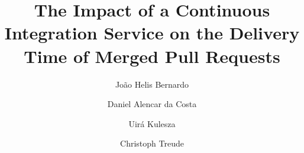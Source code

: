 \usepackage{fancyvrb} %
\usepackage{fvextra} %
\usepackage{appendix}
\usepackage{microtype}

\usepackage{tabularx}




\newcommand{\ct}[1] {\textcolor{purple}{[\textbf{Christoph}: #1]} }
\newcommand{\dac}[1] {\textcolor{blue}{[\textbf{Dan}: #1]} }
\newcommand{\jh}[1] {\textcolor{red}{[\textbf{Jo\~{a}o}: #1]} }

\newcommand{\RQone}{RQ1: Are merged pull requests released more quickly using a CI service?}
\newcommand{\RQtwo}{RQ2: Does the increased number of PR submissions after adopting a CI service increase the delivery time of pull requests?}
\newcommand{\RQthree}{RQ3: What factors impact the delivery time after adopting a CI service?}
\newcommand{\RQfive}{RQ4: What is the perceived influence of CI on the time to deliver merged PRs?}
\newcommand{\RQfour}{RQ5: What are the perceived causes of delay in the delivery time of merged PRs?}
\newcommand{\RQsix}{RQ6: What is the perceived influence of CI on the software release process?}
\newcommand{\RQseven}{RQ7: What is the perceived influence of CI on the code review process?}
\newcommand{\RQeight}{RQ8: What is the perceived influence of CI on attracting more contributors to open-source projects?}

%
%
%
%


	
	\title{
	The Impact of a Continuous Integration Service on the Delivery Time of Merged Pull Requests
	}
	
	
	\author{Jo{\~a}o Helis Bernardo         \and
		Daniel Alencar da Costa \and 
		Uir{\'a} Kulesza \and 
		Christoph Treude %
	}
	
